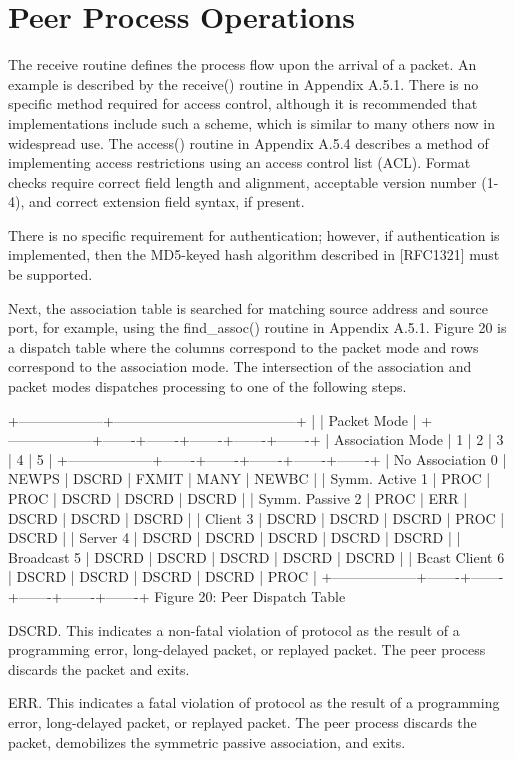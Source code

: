 \section{Peer Process Operations}

The receive routine defines the process flow upon the arrival of a
packet. An example is described by the receive() routine in
Appendix A.5.1. There is no specific method required for access
control, although it is recommended that implementations include such
a scheme, which is similar to many others now in widespread use. The
access() routine in Appendix A.5.4 describes a method of implementing
access restrictions using an access control list (ACL). Format
checks require correct field length and alignment, acceptable version
number (1-4), and correct extension field syntax, if present.

There is no specific requirement for authentication; however, if
authentication is implemented, then the MD5-keyed hash algorithm
described in [RFC1321] must be supported.

Next, the association table is searched for matching source address
and source port, for example, using the find_assoc() routine in
Appendix A.5.1. Figure 20 is a dispatch table where the columns
correspond to the packet mode and rows correspond to the association
mode. The intersection of the association and packet modes
dispatches processing to one of the following steps.

+------------------+---------------------------------------+
| | Packet Mode |
+------------------+-------+-------+-------+-------+-------+
| Association Mode | 1 | 2 | 3 | 4 | 5 |
+------------------+-------+-------+-------+-------+-------+
| No Association 0 | NEWPS | DSCRD | FXMIT | MANY | NEWBC |
| Symm. Active 1 | PROC | PROC | DSCRD | DSCRD | DSCRD |
| Symm. Passive 2 | PROC | ERR | DSCRD | DSCRD | DSCRD |
| Client 3 | DSCRD | DSCRD | DSCRD | PROC | DSCRD |
| Server 4 | DSCRD | DSCRD | DSCRD | DSCRD | DSCRD |
| Broadcast 5 | DSCRD | DSCRD | DSCRD | DSCRD | DSCRD |
| Bcast Client 6 | DSCRD | DSCRD | DSCRD | DSCRD | PROC |
+------------------+-------+-------+-------+-------+-------+
Figure 20: Peer Dispatch Table

DSCRD. This indicates a non-fatal violation of protocol as the
result of a programming error, long-delayed packet, or replayed
packet. The peer process discards the packet and exits.

ERR. This indicates a fatal violation of protocol as the result of a
programming error, long-delayed packet, or replayed packet. The peer
process discards the packet, demobilizes the symmetric passive
association, and exits.

